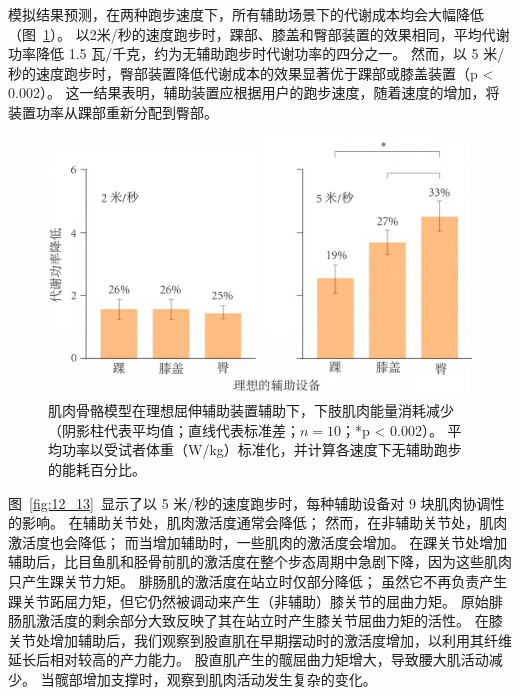 模拟结果预测，在两种跑步速度下，所有辅助场景下的代谢成本均会大幅降低（图~\ref{fig:12_12}）。
以2米/秒的速度跑步时，踝部、膝盖和臀部装置的效果相同，平均代谢功率降低 1.5 瓦/千克，约为无辅助跑步时代谢功率的四分之一。
然而，以 5 米/秒的速度跑步时，臀部装置降低代谢成本的效果显著优于踝部或膝盖装置（p < 0.002）。
这一结果表明，辅助装置应根据用户的跑步速度，随着速度的增加，将装置功率从踝部重新分配到臀部。

\begin{figure}[!htb]
	\centering
	\includegraphics[width=0.75\linewidth]{chap12/12_12}
	\caption{肌肉骨骼模型在理想屈伸辅助装置辅助下，下肢肌肉能量消耗减少（阴影柱代表平均值；直线代表标准差；$n = 10$；*p < 0.002）。
		平均功率以受试者体重（W/kg）标准化，并计算各速度下无辅助跑步的能耗百分比\cite{uchida2016simulating}。 \label{fig:12_12}}
\end{figure}


图~\ref{fig:12_13}~显示了以 5 米/秒的速度跑步时，每种辅助设备对 9 块肌肉协调性的影响。
在辅助关节处，肌肉激活度通常会降低；
然而，在非辅助关节处，肌肉激活度也会降低；
而当增加辅助时，一些肌肉的激活度会增加。
在踝关节处增加辅助后，比目鱼肌和胫骨前肌的激活度在整个步态周期中急剧下降，因为这些肌肉只产生踝关节力矩。
腓肠肌的激活度在站立时仅部分降低；
虽然它不再负责产生踝关节跖屈力矩，但它仍然被调动来产生（非辅助）膝关节的屈曲力矩。
原始腓肠肌激活度的剩余部分大致反映了其在站立时产生膝关节屈曲力矩的活性。
在膝关节处增加辅助后，我们观察到股直肌在早期摆动时的激活度增加，以利用其纤维延长后相对较高的产力能力。
股直肌产生的髋屈曲力矩增大，导致腰大肌活动减少。
当髋部增加支撑时，观察到肌肉活动发生复杂的变化。


